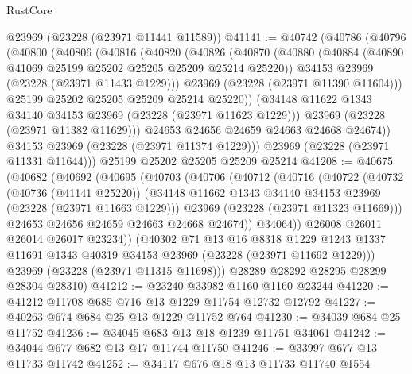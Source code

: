 \begin{lexlean}{RustCore}
\begin{coremodule}
    @23969
    (@23228 (@23971 @11441 @11589))
@41141 := @40742
    (@40786
      (@40796
        (@40800
          (@40806
            (@40816
              (@40820
                (@40826
                  (@40870
                    (@40880
                      (@40884 (@40890 @41069 @25199 @25202 @25205 @25209 @25214 @25220))
                      @34153
                      @23969
                      (@23228 (@23971 @11433 @1229)))
                    @23969
                    (@23228 (@23971 @11390 @11604)))
                  @25199
                  @25202
                  @25205
                  @25209
                  @25214
                  @25220))
              (@34148 @11622 @1343 @34140 @34153 @23969 (@23228 (@23971 @11623 @1229)))
              @23969
              (@23228 (@23971 @11382 @11629)))
            @24653
            @24656
            @24659
            @24663
            @24668
            @24674))
        @34153
        @23969
        (@23228 (@23971 @11374 @1229)))
      @23969
      (@23228 (@23971 @11331 @11644)))
    @25199
    @25202
    @25205
    @25209
    @25214
@41208 := @40675
    (@40682
      (@40692
        (@40695
          (@40703
            (@40706
              (@40712
                (@40716
                  (@40722
                    (@40732
                      (@40736 (@41141 @25220))
                      (@34148 @11662 @1343 @34140 @34153 @23969 (@23228 (@23971 @11663 @1229)))
                      @23969
                      (@23228 (@23971 @11323 @11669)))
                    @24653
                    @24656
                    @24659
                    @24663
                    @24668
                    @24674))
                @34064))
            @26008
            @26011
            @26014
            @26017
            @23234))
        (@40302
          @71
          @13
          @16
          @8318
          @1229
          @1243
          @1337
          @11691
          @1343
          @40319
          @34153
          @23969
          (@23228 (@23971 @11692 @1229)))
        @23969
        (@23228 (@23971 @11315 @11698)))
      @28289
      @28292
      @28295
      @28299
      @28304
      @28310)
@41212 := @23240 @33982 @1160 @1160 @23244
@41220 := @41212 @11708 @685 @716 @13 @1229 @11754 @12732 @12792
@41227 := @40263 @674 @684 @25 @13 @1229 @11752 @764
@41230 := @34039 @684 @25 @11752
@41236 := @34045 @683 @13 @18 @1239 @11751 @34061
@41242 := @34044 @677 @682 @13 @17 @11744 @11750
@41246 := @33997 @677 @13 @11733 @11742
@41252 := @34117 @676 @18 @13 @11733 @11740 @1554

\end{coremodule}
\end{lexlean}
